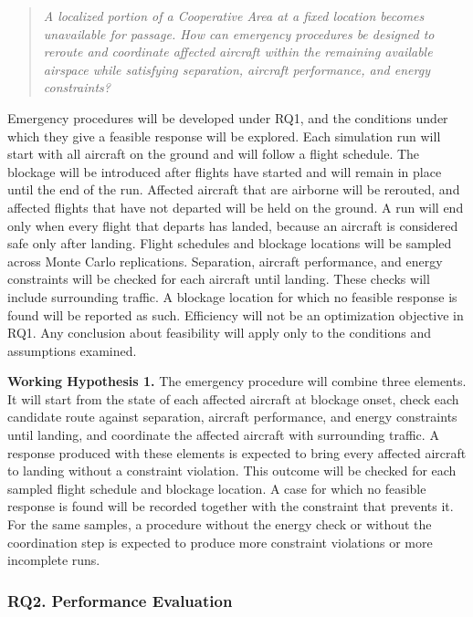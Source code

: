 \documentclass[11pt,letterpaper]{article}
\newcommand{\hypothesis}[2]{\par\noindent\textbf{Working Hypothesis #1.} #2\par}
\begin{document}
\begin{quote}
\textit{A localized portion of a Cooperative Area at a fixed location becomes unavailable for passage. How can emergency procedures be designed to reroute and coordinate affected aircraft within the remaining available airspace while satisfying separation, aircraft performance, and energy constraints?}
\end{quote}

Emergency procedures will be developed under RQ1, and the conditions under which they give a feasible response will be explored. Each simulation run will start with all aircraft on the ground and will follow a flight schedule. The blockage will be introduced after flights have started and will remain in place until the end of the run. Affected aircraft that are airborne will be rerouted, and affected flights that have not departed will be held on the ground. A run will end only when every flight that departs has landed, because an aircraft is considered safe only after landing. Flight schedules and blockage locations will be sampled across Monte Carlo replications. Separation, aircraft performance, and energy constraints will be checked for each aircraft until landing. These checks will include surrounding traffic. A blockage location for which no feasible response is found will be reported as such. Efficiency will not be an optimization objective in RQ1. Any conclusion about feasibility will apply only to the conditions and assumptions examined.

\hypothesis{1}{The emergency procedure will combine three elements. It will start from the state of each affected aircraft at blockage onset, check each candidate route against separation, aircraft performance, and energy constraints until landing, and coordinate the affected aircraft with surrounding traffic. A response produced with these elements is expected to bring every affected aircraft to landing without a constraint violation. This outcome will be checked for each sampled flight schedule and blockage location. A case for which no feasible response is found will be recorded together with the constraint that prevents it. For the same samples, a procedure without the energy check or without the coordination step is expected to produce more constraint violations or more incomplete runs.}

\subsubsection{RQ2. Performance Evaluation}
\label{sec:rq2}
\end{document}
